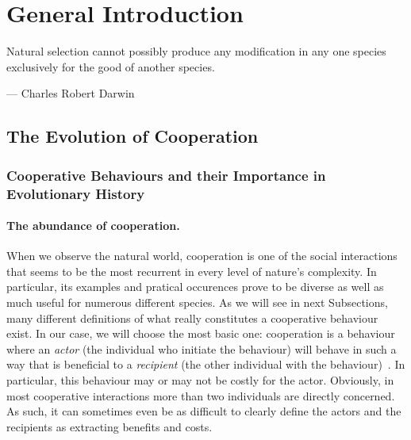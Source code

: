\chapter{General Introduction}

\epigraph{Natural selection cannot possibly produce any modification in any one species exclusively for the good of another species.}{--- \textup{Charles Robert Darwin}}

\minitoc[n] %

\section{The Evolution of Cooperation}

  \subsection{Cooperative Behaviours and their Importance in Evolutionary History}


    \subsubsection{The abundance of cooperation.} When we observe the natural world, cooperation is one of the social interactions that seems to be the most recurrent in every level of nature's complexity. In particular, its examples and pratical occurences prove to be diverse as well as much useful for numerous different species. As we will see in next Subsections, many different definitions of what really constitutes a cooperative behaviour exist. In our case, we will choose the most basic one: cooperation is a behaviour where an \emph{actor} (the individual who initiate the behaviour) will behave in such a way that is beneficial to a \emph{recipient} (the other individual with the behaviour)~\parencite{West2007a}. In particular, this behaviour may or may not be costly for the actor. Obviously, in most cooperative interactions more than two individuals are directly concerned. As such, it can sometimes even be as difficult to clearly define the actors and the recipients as extracting benefits and costs.

